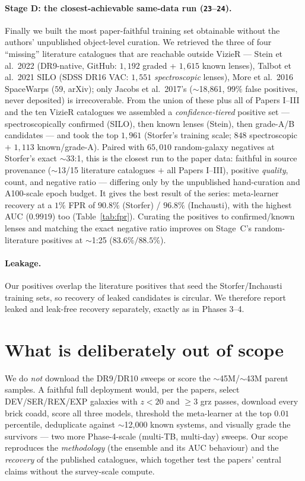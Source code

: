 \documentclass[11pt,letterpaper]{article}
\begin{document}
\paragraph{Stage D: the closest-achievable same-data run (\texttt{23}--\texttt{24}).}
Finally we built the most paper-faithful training set obtainable without the
authors' unpublished object-level curation. We retrieved the three of four
``missing'' literature catalogues that are reachable outside VizieR --- Stein
et al.\ 2022 (DR9-native, GitHub: $1{,}192$ graded + $1{,}615$ known lenses),
Talbot et al.\ 2021 SILO (SDSS DR16 VAC: $1{,}551$ \emph{spectroscopic} lenses),
More et al.\ 2016 SpaceWarps ($59$, arXiv); only Jacobs et al.\ 2017's
($\sim$18{,}861, $99\%$ false positives, never deposited) is irrecoverable. From
the union of these plus all of Papers I--III and the ten VizieR catalogues we
assembled a \emph{confidence-tiered} positive set --- spectroscopically confirmed
(SILO), then known lenses (Stein), then grade-A/B candidates --- and took the top
$1{,}961$ (Storfer's training scale; $848$ spectroscopic $+$ $1{,}113$
known/grade-A). Paired with $65{,}010$ random-galaxy negatives at Storfer's exact
$\sim$33:1, this is the closest run to the paper data: faithful in source
provenance ($\sim$13/15 literature catalogues $+$ all Papers I--III), positive
\emph{quality}, count, and negative ratio --- differing only by the unpublished
hand-curation and A100-scale epoch budget. It gives the best result of the
series: meta-learner recovery at a $1\%$ FPR of $\mathbf{90.8\%}$ (Storfer) /
$\mathbf{96.8\%}$ (Inchausti), with the highest AUC ($0.9919$) too
(Table~\ref{tab:fpr}). Curating the positives to confirmed/known lenses and
matching the exact negative ratio improves on Stage~C's random-literature
positives at $\sim$1:25 ($83.6\%/88.5\%$).

\paragraph{Leakage.} Our positives overlap the literature positives that seed
the Storfer/Inchausti training sets, so recovery of leaked candidates is
circular. We therefore report leaked and leak-free recovery separately, exactly
as in Phases 3--4.

\section{What is deliberately out of scope}
\label{sec:scope}

We do \emph{not} download the DR9/DR10 sweeps or score the $\sim$45M/$\sim$43M
parent samples. A faithful full deployment would, per the papers, select
DEV/SER/REX/EXP galaxies with $z<20$ and $\ge3$ grz passes, download every brick
coadd, score all three models, threshold the meta-learner at the top
$0.01$ percentile, deduplicate against $\sim$12{,}000 known systems, and visually
grade the survivors --- two more Phase-4-scale (multi-TB, multi-day) sweeps. Our
scope reproduces the \emph{methodology} (the ensemble and its AUC behaviour) and
the \emph{recovery} of the published catalogues, which together test the papers'
central claims without the survey-scale compute.
\end{document}
